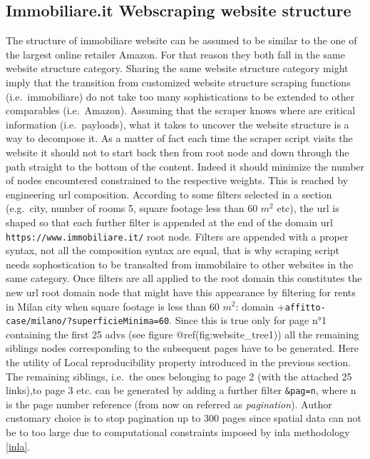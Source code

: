 \documentclass[
  12pt,
  a4paper,
  oneside]{book}
\theoremstyle{definition}
\theoremstyle{definition}
\theoremstyle{definition}
\theoremstyle{remark}
\begin{document}
\hypertarget{webstructure}{%
\subsection{Immobiliare.it Webscraping website structure}\label{webstructure}}

The structure of immobiliare website can be assumed to be similar to the one of the largest online retailer Amazon. For that reason they both fall in the same website structure category. Sharing the same website structure category might imply that the transition from customized website structure scraping functions (i.e.~immobiliare) do not take too many sophistications to be extended to other comparables (i.e.~Amazon). Assuming that the scraper knows where are critical information (i.e.~payloads), what it takes to uncover the website structure is a way to decompose it. As a matter of fact each time the scraper script visits the website it should not to start back then from root node and down through the path straight to the bottom of the content. Indeed it should minimize the number of nodes encountered constrained to the respective weights. This is reached by engineering url composition.
According to some filters selected in a section (e.g.~city, number of rooms 5, square footage less than 60 \(m^2\) etc), the url is shaped so that each further filter is appended at the end of the domain url \texttt{https://www.immobiliare.it/} root node. Filters are appended with a proper syntax, not all the composition syntax are equal, that is why scraping script needs sophostication to be transalted from immobilaire to other websites in the same category. Once filters are all applied to the root domain this constitutes the new url root domain node that might have this appearance by filtering for rents in Milan city when square footage is less than 60 \(m^2\): domain +\texttt{affitto-case/milano/?superficieMinima=60}. Since this is true only for page n°1 containing the first 25 advs (see figure @ref(fig:website\_tree1)) all the remaining siblings nodes corresponding to the subsequent pages have to be generated. Here the utility of Local reproducibility property introduced in the previous section. The remaining siblings, i.e.~the ones belonging to page 2 (with the attached 25 links),to page 3 etc. can be generated by adding a further filter \texttt{\&pag=n}, where n is the page number reference (from now on referred as \emph{pagination}). Author customary choice is to stop pagination up to 300 pages since spatial data can not be to too large due to computational constraints imposed by inla methodology \ref{inla}.
\end{document}
